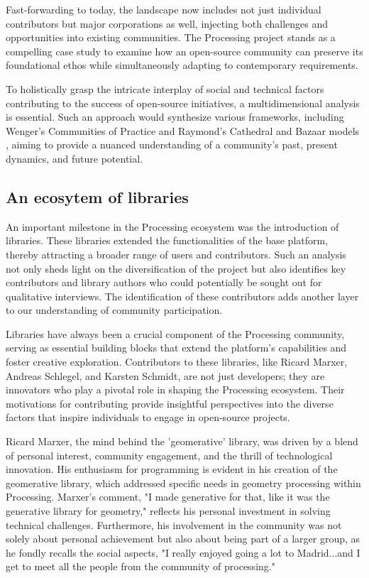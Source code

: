 Fast-forwarding to today, the landscape now includes not just individual contributors but major corporations as well, injecting both challenges and opportunities into existing communities. The Processing project stands as a compelling case study to examine how an open-source community can preserve its foundational ethos while simultaneously adapting to contemporary requirements.

To holistically grasp the intricate interplay of social and technical factors contributing to the success of open-source initiatives, a multidimensional analysis is essential. Such an approach would synthesize various frameworks, including Wenger's Communities of Practice \parencite{wengerCommunitiesPracticeLearning1998} and Raymond's Cathedral and Bazaar models \parencite{CathedralBazaarMusings2002a}, aiming to provide a nuanced understanding of a community's past, present dynamics, and future potential.

\subsection{An ecosytem of libraries}
An important milestone in the Processing ecosystem was the introduction of libraries. These libraries extended the functionalities of the base platform, thereby attracting a broader range of users and contributors. Such an analysis not only sheds light on the diversification of the project but also identifies key contributors and library authors who could potentially be sought out for qualitative interviews. The identification of these contributors adds another layer to our understanding of community participation.

Libraries have always been a crucial component of the Processing community, serving as essential building blocks that extend the platform's capabilities and foster creative exploration. Contributors to these libraries, like Ricard Marxer, Andreas Schlegel, and Karsten Schmidt, are not just developers; they are innovators who play a pivotal role in shaping the Processing ecosystem. Their motivations for contributing provide insightful perspectives into the diverse factors that inspire individuals to engage in open-source projects.

Ricard Marxer, the mind behind the 'geomerative' library, was driven by a blend of personal interest, community engagement, and the thrill of technological innovation. His enthusiasm for programming is evident in his creation of the geomerative library, which addressed specific needs in geometry processing within Processing. Marxer's comment, "I made generative for that, like it was the generative library for geometry," reflects his personal investment in solving technical challenges. Furthermore, his involvement in the community was not solely about personal achievement but also about being part of a larger group, as he fondly recalls the social aspects, "I really enjoyed going a lot to Madrid...and I get to meet all the people from the community of processing."

